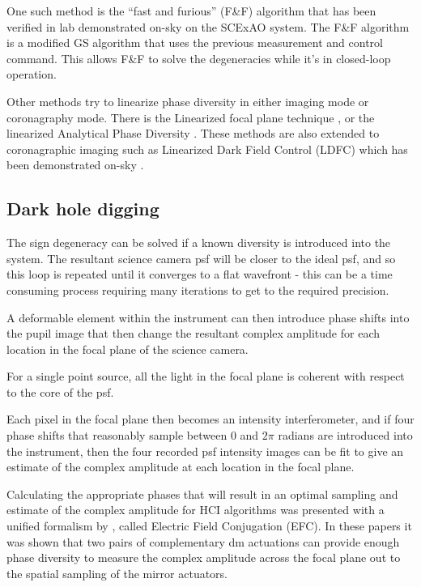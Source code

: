 \documentclass[letterpaper]{ar-1col}
\begin{document}
%
One such method is the ``fast and furious'' (F\&F) algorithm \citep{Keller12} that has been verified in lab \citep{Wilby18} demonstrated on-sky \citep{Bos20} on the SCExAO system. The F\&F algorithm is a modified GS algorithm that uses the previous measurement and control command. This allows F\&F to solve the degeneracies while it's in closed-loop operation.

%
Other methods try to linearize phase diversity in either imaging mode or coronagraphy mode. There is the Linearized focal plane technique  \citep[LIFT; ][]{meimon2010lift}, or the linearized Analytical Phase Diversity \citep[LAPD; ][]{vievard2020cophasing}.
%
These methods are also extended to coronagraphic imaging such as Linearized Dark Field Control (LDFC) which has been demonstrated on-sky \citep{miller2017spatial,miller2019spatial,ahn2023combining}.


\subsection{Dark hole digging}



The sign degeneracy can be solved if a known diversity is introduced into the system.
%
The resultant science camera \ac{psf} will be closer to the ideal \ac{psf}, and so this loop is repeated until it converges to a flat wavefront - this can be a time consuming process requiring many iterations to get to the required precision.
%


%
A deformable element within the instrument can then introduce phase shifts into the pupil image that then change the resultant complex amplitude for each location in the focal plane of the science camera.

%
For a single point source, all the light in the focal plane is coherent with respect to the core of the \ac{psf}.

%
Each pixel in the focal plane then becomes an intensity interferometer, and if four phase shifts that reasonably sample between $0$ and $2\pi$ radians are introduced into the instrument, then the four recorded \ac{psf} intensity images can be fit to give an estimate of the complex amplitude at each location in the focal plane.

Calculating the appropriate phases that will result in an optimal sampling and estimate of the complex amplitude for HCI algorithms was presented with a unified formalism by \citet{Giveon09,Giveon10}, called Electric Field Conjugation (EFC).
%
In these papers it was shown that two pairs of complementary \ac{dm} actuations can provide enough phase diversity to measure the complex amplitude across the focal plane out to the spatial sampling of the mirror actuators.
\end{document}
